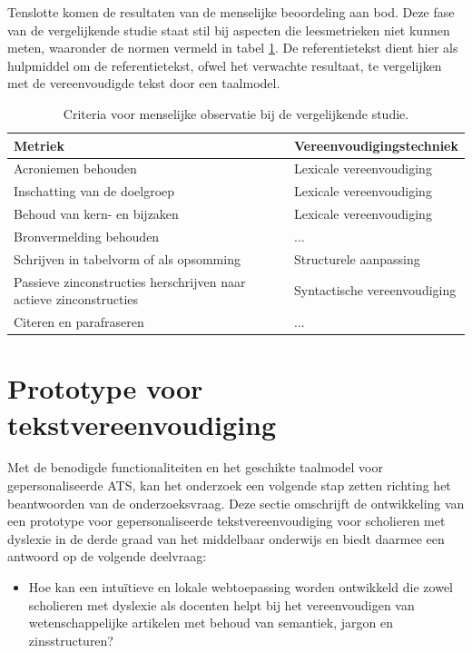 %
Tenslotte komen de resultaten van de menselijke beoordeling aan bod. Deze fase van de vergelijkende studie staat stil bij aspecten die leesmetrieken niet kunnen meten, waaronder de normen vermeld in tabel \ref{table:criteria-vergelijkende-studie-human-obv}. De referentietekst dient hier als hulpmiddel om de referentietekst, ofwel het verwachte resultaat, te vergelijken met de vereenvoudigde tekst door een taalmodel. 

\begin{table}
	\begin{tabular}{| m{6cm} | m{6cm} |}
		\hline
		\textbf{Metriek} & \textbf{Vereenvoudigingstechniek} \\ \hline
		Acroniemen behouden & Lexicale vereenvoudiging 	\\ \hline
		Inschatting van de doelgroep & Lexicale vereenvoudiging	\\ \hline
		Behoud van kern- en bijzaken & Lexicale vereenvoudiging \\ \hline
		Bronvermelding behouden &  ... \\ \hline
		Schrijven in tabelvorm of als opsomming & Structurele aanpassing \\ \hline
		Passieve zinconstructies herschrijven naar actieve zinconstructies & Syntactische vereenvoudiging \\ \hline
		Citeren en parafraseren & ... \\ \hline
	\end{tabular}
	\caption{Criteria voor menselijke observatie bij de vergelijkende studie.}
	\label{table:criteria-vergelijkende-studie-human-obv}
\end{table}

\section{Prototype voor tekstvereenvoudiging}

Met de benodigde functionaliteiten en het geschikte taalmodel voor gepersonaliseerde ATS, kan het onderzoek een volgende stap zetten richting het beantwoorden van de onderzoeksvraag. Deze sectie omschrijft de ontwikkeling van een prototype voor gepersonaliseerde tekstvereenvoudiging voor scholieren met dyslexie in de derde graad van het middelbaar onderwijs en biedt daarmee een antwoord op de volgende deelvraag: 

\begin{itemize}
	\item Hoe kan een intuïtieve en lokale webtoepassing worden ontwikkeld die zowel scholieren met dyslexie als docenten helpt bij het vereenvoudigen van wetenschappelijke artikelen met behoud van semantiek, jargon en zinsstructuren?
\end{itemize}

